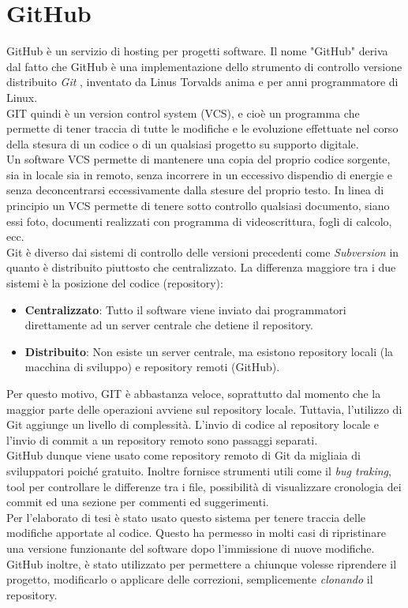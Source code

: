 \section{GitHub}
\label{sec:github}
GitHub è un servizio di hosting per progetti software. Il nome "GitHub" deriva dal fatto che GitHub è una implementazione dello strumento di controllo versione distribuito \textit{Git} \cite{git:wiki}, inventato da Linus Torvalds anima e per anni programmatore di Linux. 
\\ GIT quindi è un version control system (VCS), e cioè un programma che permette di tener traccia di tutte le modifiche e le evoluzione effettuate nel corso della stesura di un codice o di un qualsiasi progetto su supporto digitale.
\\ Un software VCS permette di mantenere una copia del proprio codice
sorgente, sia in locale sia in remoto, senza incorrere in un eccessivo dispendio di energie e senza deconcentrarsi eccessivamente dalla stesure del proprio testo. In linea di principio un VCS permette di tenere sotto controllo qualsiasi documento, siano essi foto, documenti realizzati con programma di videoscrittura, fogli di calcolo, ecc.
\\ Git è diverso dai sistemi di controllo delle versioni precedenti come \textit{Subversion} in quanto è distribuito piuttosto che centralizzato. La differenza maggiore tra i due sistemi è la posizione del codice (repository): 
\begin{itemize}
\item \textbf{Centralizzato}: Tutto il software viene inviato dai programmatori direttamente ad un server centrale che detiene il repository.
\item \textbf{Distribuito}: Non esiste un server centrale, ma esistono repository locali (la macchina di sviluppo) e repository remoti (GitHub).
\end{itemize}
Per questo motivo, GIT è abbastanza veloce, soprattutto dal momento che la maggior parte delle operazioni avviene sul repository locale. Tuttavia, l'utilizzo di Git aggiunge un livello di complessità. L'invio di codice al repository locale e l'invio di commit a un repository remoto sono passaggi separati.
\\ GitHub dunque viene usato come repository remoto di Git da migliaia di sviluppatori poiché gratuito. Inoltre fornisce strumenti utili come il \textit{bug traking}, tool per controllare le differenze tra i file, possibilità di visualizzare cronologia dei commit ed una sezione per commenti ed suggerimenti.
\\ Per l'elaborato di tesi è stato usato questo sistema per tenere traccia delle modifiche apportate al codice. Questo ha permesso in molti casi di ripristinare una versione funzionante del software dopo l'immissione di nuove modifiche. GitHub inoltre, è stato utilizzato per permettere a chiunque volesse riprendere il progetto, modificarlo o applicare delle correzioni, semplicemente \textit{clonando} il repository.
